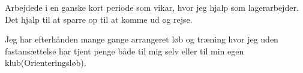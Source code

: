 \documentclass[11pt,a4paper,sans]{moderncv} %
\begin{document}
Arbejdede i en ganske kort periode som vikar, hvor jeg hjalp som lagerarbejder. Det hjalp til at sparre op til at komme ud og rejse. 
%
%



%


Jeg har efterh\aa nden mange gange arrangeret l\o b og tr\ae ning hvor jeg uden fastans\ae ttelse har tjent penge b\aa de til mig selv eller til min egen klub(Orienteringsl\o b).

%
\end{document}
